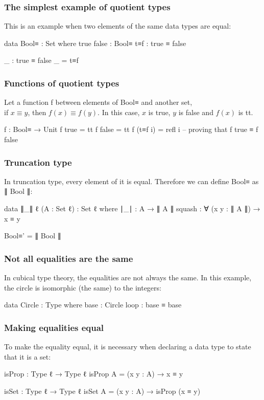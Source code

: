 \documentclass{beamer}
\begin{document}
\begin{frame}
  \frametitle{The simplest example of quotient types}
  This is an example when two elements of the same data types are equal:
  \begin{code}
  data Bool≡ : Set where
    true false : Bool≡
    t≡f : true ≡ false

  _ : true ≡ false
  _ = t≡f
  \end{code}
\end{frame}

\begin{frame}
  \frametitle{Functions of quotient types}
  Let a function f between elements of Bool≡ and another set, \\
  if $ x \equiv y $, then $ f(x) \equiv f(y) $.
  In this case, $ x $ is true, $ y $ is false and $ f(x) $ is tt.
  \begin{code}
  f : Bool≡ → Unit
  f true    = tt
  f false   = tt
  f (t≡f i) = refl i -- proving that f true ≡ f false

  \end{code}

\end{frame}

\begin{frame}
  \frametitle{Truncation type}

  In truncation type, every element of it is equal.
  Therefore we can define Bool≡ as ∥ Bool ∥:

  \begin{code}
  data ∥_∥ {ℓ} (A : Set ℓ) : Set ℓ where
    ∣_∣ : A → ∥ A ∥
    squash : ∀ (x y : ∥ A ∥) → x ≡ y

  Bool≡' = ∥ Bool ∥
  \end{code}
\end{frame}

\begin{frame}
  \frametitle{Not all equalities are the same}
  In cubical type theory, the equalities are not always the same.
  In this example, the circle is isomorphic (the same) to the integers:
  \begin{code}
  data Circle : Type where
    base : Circle
    loop : base ≡ base
  \end{code}
\end{frame}

\begin{frame}
  \frametitle{Making equalities equal}
  To make the equality equal, it is necessary when declaring a data type to state that it is a set:
  \begin{code}
  isProp : Type ℓ → Type ℓ
  isProp A = (x y : A) → x ≡ y

  isSet : Type ℓ → Type ℓ
  isSet A = (x y : A) → isProp (x ≡ y)
  \end{code}
\end{frame}
\end{document}
